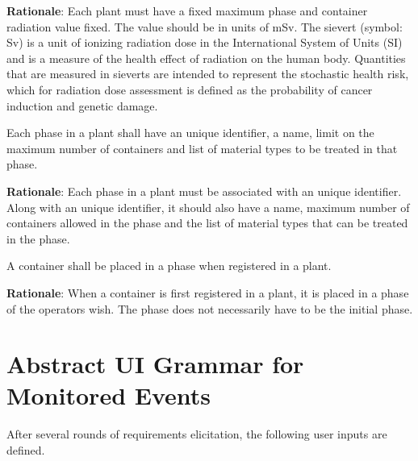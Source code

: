 \smallskip
\noindent \textbf{Rationale}: Each plant must have a fixed maximum phase and container radiation value fixed. The value should be in units of mSv. The sievert (symbol: Sv) is a unit of ionizing radiation dose in the International System of Units (SI) and is a measure of the health effect of radiation on the human body. Quantities that are measured in sieverts are intended to represent the stochastic health risk, which for radiation dose assessment is defined as the probability of cancer induction and genetic damage.

\rdescription
{Each phase in a plant shall have an unique identifier, a name, limit on the maximum number of containers and list of material types to be treated in that phase.\\}
{}
\label{R2}

\smallskip
\noindent \textbf{Rationale}: Each phase in a plant must be associated with an unique identifier. Along with an unique identifier, it should also have a name, maximum number of containers allowed in the phase and the list of material types that can be treated in the phase.

\rdescription
{A container shall be placed in a phase when registered in a plant.\\}
{}
\label{R3}

\smallskip
\noindent \textbf{Rationale}: When a container is first registered in a plant, it is placed in a phase of the operators wish. The phase does not necessarily have to be the initial phase.



\newpage
\section{Abstract UI Grammar for Monitored Events}

After several rounds of requirements elicitation, the following user inputs are defined.

